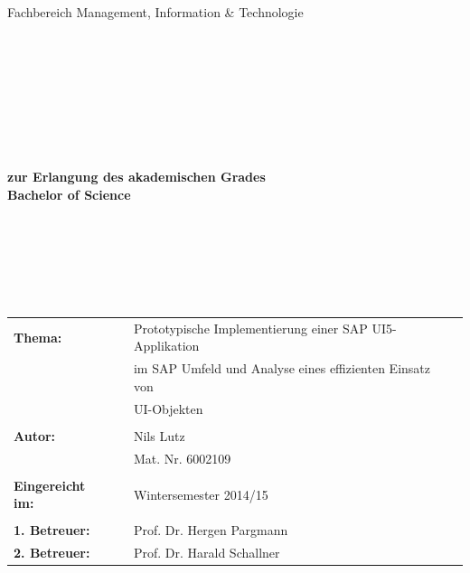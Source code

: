 \begin{center}
\Large{Fachbereich Management, Information \& Technologie}
\end{center}
\begin{verbatim}




\end{verbatim}
\begin{center}
\doublespacing
\textbf{\LARGE{\titleDocument}}\\
\singlespacing
\begin{verbatim}

\end{verbatim}
\end{center}
\begin{verbatim}

\end{verbatim}
\begin{center}

\end{center}
\begin{verbatim}

\end{verbatim}
\begin{center}
\textbf{zur Erlangung des akademischen Grades \\ Bachelor of Science}
\end{center}
\begin{verbatim}






\end{verbatim}
\begin{flushleft}
\begin{tabular}{llll}
\textbf{Thema:} & & Prototypische Implementierung einer SAP UI5-Applikation & \\
& & im SAP Umfeld und Analyse eines effizienten Einsatz von & \\
& & UI-Objekten & \\
& & & \\
\textbf{Autor:} & & Nils Lutz& \\
& & Mat. Nr. 6002109 & \\
& & & \\
\textbf{Eingereicht im:} & & Wintersemester 2014/15 &\\
& & & \\
\textbf{1. Betreuer:} & & Prof. Dr. Hergen Pargmann &\\
\textbf{2. Betreuer:} & & Prof. Dr. Harald Schallner &\\
\end{tabular}
\end{flushleft}